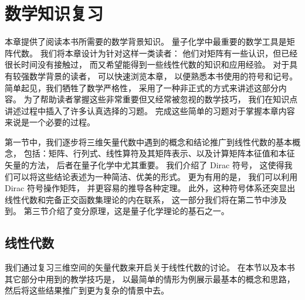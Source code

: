 \chapter{数学知识复习}
\label{ch:1}

本章提供了阅读本书所需要的数学背景知识。
量子化学中最重要的数学工具是矩阵代数。
我们将本章设计为针对这样一类读者：
他们对矩阵有一些认识，但已经很长时间没有接触过，
而又希望能得到一些线性代数的知识和应用经验。
对于具有较强数学背景的读者，
可以快速浏览本章，
以便熟悉本书使用的符号和记号。
简单起见，我们牺牲了数学严格性，
采用了一种非正式的方式来讲述这部分内容。
为了帮助读者掌握这些非常重要但又经常被忽视的数学技巧，
我们在知识点讲述过程中插入了许多认真选择的习题。
完成这些简单的习题对于掌握本章内容来说是一个必要的过程。

第一节中，我们逐步将三维矢量代数中遇到的概念和结论推广到线性代数的基本概念，
包括：矩阵、行列式、线性算符及其矩阵表示、以及计算矩阵本征值和本征矢量的方法，
后者在量子化学中尤其重要。
我们介绍了 Dirac 符号，
这使得我们可以将这些结论表述为一种简洁、优美的形式。
更为有用的是，
我们可以利用 Dirac 符号操作矩阵，
并更容易的推导各种定理。
此外，这种符号体系还突显出线性代数和完备正交函数集理论的内在联系，
这一部分我们将在第二节中涉及到。
第三节介绍了变分原理，这是量子化学理论的基石之一。

\section{线性代数}
\label{sec:1.1}

我们通过复习三维空间的矢量代数来开启关于线性代数的讨论。
在本节以及本书其它部分中用到的教学技巧是，
以最简单的情形为例展示最基本的概念和思路，
然后将这些结果推广到更为复杂的情景中去。

